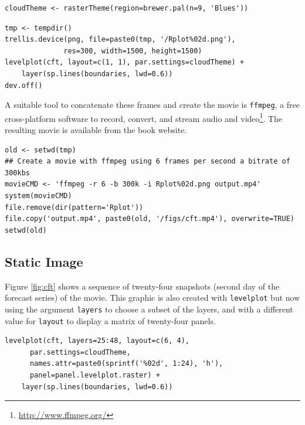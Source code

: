 \lstset{language=R,numbers=none}
\begin{lstlisting}
cloudTheme <- rasterTheme(region=brewer.pal(n=9, 'Blues'))
\end{lstlisting}


\lstset{language=R,numbers=none}
\begin{lstlisting}
tmp <- tempdir()
trellis.device(png, file=paste0(tmp, '/Rplot%02d.png'),
		      res=300, width=1500, height=1500)
levelplot(cft, layout=c(1, 1), par.settings=cloudTheme) +
    layer(sp.lines(boundaries, lwd=0.6))
dev.off()
\end{lstlisting}

A suitable tool to concatenate these frames and create the movie is
\texttt{ffmpeg}, a free cross-platform software to record, convert, and stream
audio and video\footnote{\url{http://www.ffmpeg.org/}}. The resulting movie is available from the book
website.


\lstset{language=R,numbers=none}
\begin{lstlisting}
old <- setwd(tmp)
## Create a movie with ffmpeg using 6 frames per second a bitrate of 300kbs
movieCMD <- 'ffmpeg -r 6 -b 300k -i Rplot%02d.png output.mp4'
system(movieCMD)
file.remove(dir(pattern='Rplot'))
file.copy('output.mp4', paste0(old, '/figs/cft.mp4'), overwrite=TRUE)
setwd(old)
\end{lstlisting}
\subsection{Static Image}
\label{sec-5-4}
Figure \ref{fig:cft} shows a sequence of twenty-four snapshots (second day
of the forecast series) of the movie. This graphic is also created
with \texttt{levelplot} but now using the argument \texttt{layers} to choose a
subset of the layers, and with a different value for \texttt{layout} to
display a matrix of twenty-four panels.
\lstset{language=R,numbers=none}
\begin{lstlisting}
levelplot(cft, layers=25:48, layout=c(6, 4),
	  par.settings=cloudTheme,
	  names.attr=paste0(sprintf('%02d', 1:24), 'h'),
	  panel=panel.levelplot.raster) +
    layer(sp.lines(boundaries, lwd=0.6))
\end{lstlisting}

